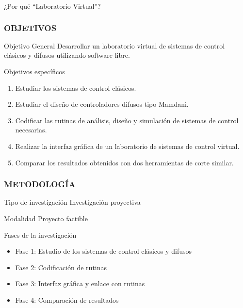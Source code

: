 \documentclass[usenames,xcolor={dvipsnames, table}]{beamer}
\begin{document}
\begin{frame}
\begin{block}{¿Por qué ``Laboratorio Virtual''?}
\begin{figure}
			\end{figure}
	\end{block}
\end{frame}

\begin{frame}
	\frametitle{OBJETIVOS}
	\vspace{20pt}
	\begin{block}{Objetivo General}
		Desarrollar un laboratorio virtual de sistemas de control clásicos y difusos utilizando software libre.
	\end{block}
	
	\begin{block}{Objetivos específicos}
		\begin{enumerate} 
			\item Estudiar los sistemas de control clásicos.
			\item Estudiar el diseño de controladores difusos tipo Mamdani.
			\item Codificar las rutinas de análisis, diseño y simulación de sistemas de control necesarias.
			\item Realizar la interfaz gráfica de un laboratorio de sistemas de control virtual.
			\item Comparar los resultados obtenidos con dos herramientas de corte similar.
		\end{enumerate}
	\end{block}
	
\end{frame}

\begin{frame}
	\frametitle{METODOLOGÍA}

	\vspace{20pt}
	
	\begin{block}{Tipo de investigación}
		Investigación proyectiva
	\end{block}

	\begin{block}{Modalidad}
		Proyecto factible
	\end{block}

	\begin{block}{Fases de la investigación}
		\begin{itemize}
			\item Fase 1: Estudio de los sistemas de control clásicos y difusos
			\item Fase 2: Codificación de rutinas
			\item Fase 3: Interfaz gráfica y enlace con rutinas
			\item Fase 4: Comparación de resultados
		\end{itemize}
	\end{block}	
\end{frame}
\end{document}
